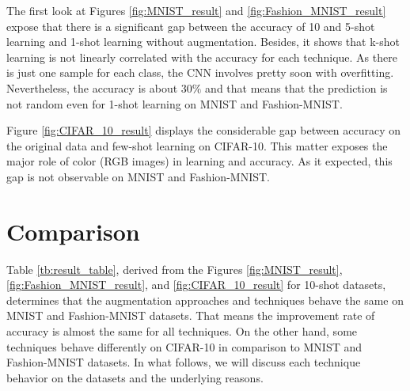 The first look at Figures \ref{fig:MNIST_result} and \ref{fig:Fashion_MNIST_result} expose that there is
a significant gap between the accuracy of 10 and 5-shot learning and 1-shot learning without augmentation. Besides,
it shows that k-shot learning is not linearly correlated with the accuracy for each technique. As there is
just one sample for each class, the CNN involves pretty soon with overfitting. Nevertheless, the
accuracy is about $30\%$ and that means that the prediction is not random even for 1-shot
learning on MNIST and Fashion-MNIST.

Figure \ref{fig:CIFAR_10_result} displays the considerable gap
between accuracy on the original data and few-shot learning on CIFAR-10. This matter exposes the major
role of color (RGB images) in learning and accuracy. As it expected, this gap is not observable on MNIST
and Fashion-MNIST.

\section{Comparison}

Table \ref{tb:result_table}, derived from the Figures \ref{fig:MNIST_result}, \ref{fig:Fashion_MNIST_result}, and
\ref{fig:CIFAR_10_result} for 10-shot datasets, determines that the augmentation approaches and
techniques behave the same on MNIST and Fashion-MNIST datasets. That means the improvement rate of
accuracy is almost the same for all techniques. On the other hand, some techniques behave
differently on CIFAR-10 in comparison to MNIST and Fashion-MNIST datasets. In what follows, we will
discuss each technique behavior on the datasets and the underlying reasons.

